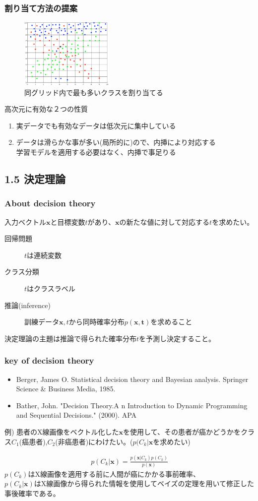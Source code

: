 \documentclass[dvipdfmx]{beamer}
\theoremstyle{definition}
\begin{document}
\begin{frame}
  \frametitle{割り当て方法の提案}
  \begin{figure}[htb]
    \centering
    \includegraphics[width=4.5cm,clip]{res/curse_dim_grid.eps}
    \caption{同グリッド内で最も多いクラスを割り当てる}
  \end{figure}
  高次元に有効な２つの性質
  \begin{enumerate}
    \item 実データでも有効なデータは低次元に集中している
    \item データは滑らかな事が多い(局所的に)ので、内挿により対応する \hfill \\
      学習モデルを適用する必要はなく、内挿で事足りる
  \end{enumerate}
\end{frame}
\subsection{1.5 決定理論}
\begin{frame}
  \frametitle{About decision theory}
  入力ベクトル$\bm{x}$と目標変数$t$があり、$\bm{x}$の新たな値に対して対応する$t$を求めたい。
  \begin{description}
    \item[回帰問題]
    $t$は連続変数
    \item[クラス分類]
    $t$はクラスラベル
    \item[推論(inference)]訓練データ${\bm{x},t}$から同時確率分布$p(\bm{x},\bm{t})$を求めること
  \end{description}
  決定理論の主題は推論で得られた確率分布$t$を予測し決定すること。
\end{frame}

\begin{frame}
  \frametitle{key of decision theory}
  \begin{itemize}
    \item Berger, James O. Statistical decision theory and Bayesian analysis. Springer Science \& Business Media, 1985.    \item Bather, John. "Decision Theory.A n Introduction to Dynamic Programming and Sequential Decisions." (2000).
    APA
  \end{itemize}
  例) 患者のX線画像をベクトル化した$\bm{x}$を使用して、その患者が癌かどうかをクラス$C_1$(癌患者),$C_2$(非癌患者)にわけたい。($p(C_k|\bm{x}$を求めたい)
  
  \begin{gather*}
    p(C_k|\bm{x}) = \frac{p(\bm{x}|C_k)p(C_k)}{p(\bm{x})}
  \end{gather*}
  $p(C_k)$はX線画像を適用する前に人間が癌にかかる事前確率、\\ $p(C_k|\bm{x})$はX線画像から得られた情報を使用してベイズの定理を用いて修正した事後確率である。
\end{frame}
\end{document}
